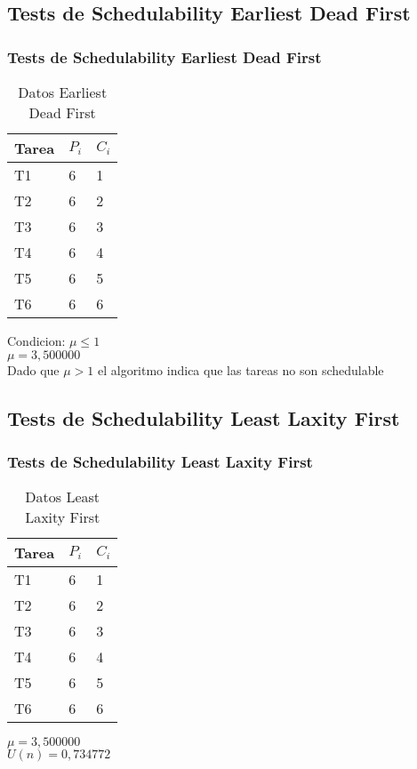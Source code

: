 \documentclass[xcolor=table]{beamer}
\begin{document}
\subsection{Tests de Schedulability  Earliest Dead First } 

\begin{frame} 
\frametitle{Tests de Schedulability  Earliest Dead First } 
\begin{table} 
\centering 
\begin{tabular}{|l|l|l|} 
\hline 
\cellcolor{lightgray}Tarea & \cellcolor{lightgray}$P_i$ & \cellcolor{lightgray}$C_i$ \\ \hline 
T1   & 6  &  1\\ \hline 
T2   & 6  &  2\\ \hline 
T3   & 6  &  3\\ \hline 
T4   & 6  &  4\\ \hline 
T5   & 6  &  5\\ \hline 
T6   & 6  &  6\\ \hline 
\end{tabular} 
\caption{Datos  Earliest Dead First } 
\end{table} 
Condicion: $\mu \leq 1$ \\ 
$\mu =  3,500000 $ \\ 
Dado que $\mu>1$ el algoritmo indica que las tareas no son schedulable \\ 
\end{frame} 

\subsection{Tests de Schedulability  Least Laxity First } 

\begin{frame} 
\frametitle{Tests de Schedulability  Least Laxity First } 
\begin{table} 
\centering 
\begin{tabular}{|l|l|l|} 
\hline 
\cellcolor{lightgray}Tarea & \cellcolor{lightgray}$P_i$ & \cellcolor{lightgray}$C_i$ \\ \hline 
T1   & 6  &  1\\ \hline 
T2   & 6  &  2\\ \hline 
T3   & 6  &  3\\ \hline 
T4   & 6  &  4\\ \hline 
T5   & 6  &  5\\ \hline 
T6   & 6  &  6\\ \hline 
\end{tabular} 
\caption{Datos  Least Laxity First } 
\end{table} 
$\mu =  3,500000 $ \\ 
$U(n) =  0,734772 $ \\ 
\end{frame} 
\end{document}
